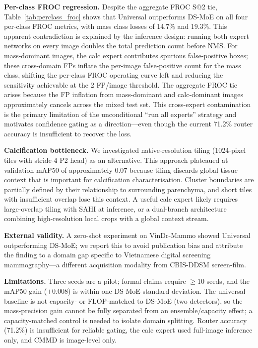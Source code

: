 \documentclass[runningheads]{llncs}
\begin{document}
\textbf{Per-class FROC regression.} Despite the aggregate FROC S@2 tie,
Table~\ref{tab:perclass_froc} shows that Universal outperforms DS-MoE on
all four per-class FROC metrics, with mass class losses of 14.7\% and
19.3\%. This apparent contradiction is explained by the inference design:
running both expert networks on every image doubles the total prediction
count before NMS. For mass-dominant images, the calc expert contributes
spurious false-positive boxes; these cross-domain FPs inflate the per-image
false-positive count for the mass class, shifting the per-class FROC
operating curve left and reducing the sensitivity achievable at the
2 FP/image threshold. The aggregate FROC tie arises because the FP
inflation from mass-dominant and calc-dominant images approximately
cancels across the mixed test set. This cross-expert contamination is
the primary limitation of the unconditional ``run all experts'' strategy
and motivates confidence gating as a direction---even though the current
71.2\% router accuracy is insufficient to recover the loss.

\textbf{Calcification bottleneck.} We investigated native-resolution
tiling (1024-pixel tiles with stride-4 P2 head) as an alternative.
This approach plateaued at validation mAP50 of approximately 0.07
because tiling discards global tissue context that is important for
calcification characterisation. Cluster boundaries are partially defined
by their relationship to surrounding parenchyma, and short tiles with
insufficient overlap lose this context. A useful calc expert likely
requires large-overlap tiling with SAHI \cite{akyon2022sahi} at inference,
or a dual-branch architecture combining high-resolution local crops with
a global context stream.

\textbf{External validity.} A zero-shot experiment on VinDr-Mammo
\cite{nguyen2023vindr} showed Universal outperforming DS-MoE; we report
this to avoid publication bias and attribute the finding to a domain gap
specific to Vietnamese digital screening mammography---a different
acquisition modality from CBIS-DDSM screen-film.

\textbf{Limitations.} Three seeds are a pilot; formal claims require
$\geq 10$ seeds, and the mAP50 gain ($+0.008$) is within one DS-MoE
standard deviation. The universal baseline is not capacity- or
FLOP-matched to DS-MoE (two detectors), so the mass-precision gain
cannot be fully separated from an ensemble/capacity effect; a
capacity-matched control is needed to isolate domain splitting. Router
accuracy (71.2\%) is insufficient for reliable gating, the calc expert
used full-image inference only, and CMMD is image-level only.
\end{document}
